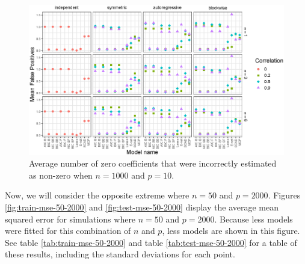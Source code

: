 \documentclass{article}
\begin{document}
\begin{figure}[h!]
	\centering
	\includegraphics[width = \textwidth]{images/facet-fp/facet_fp_1000_10.eps}
	\caption{Average number of zero coefficients that were incorrectly estimated as non-zero when $n = 1000$ and $p = 10$.}
	\label{fig:fp-1000-10}
\end{figure}

Now, we will consider the opposite extreme where $n = 50$ and $p = 2000$. Figures \ref{fig:train-mse-50-2000} and \ref{fig:test-mse-50-2000} display the average mean squared error for simulations where $n = 50$ and $p = 2000$. Because less models were fitted for this combination of $n$ and $p$, less models are shown in this figure. See table \ref{tab:train-mse-50-2000} and table \ref{tab:test-mse-50-2000} for a table of these results, including the standard deviations for each point.
\end{document}
